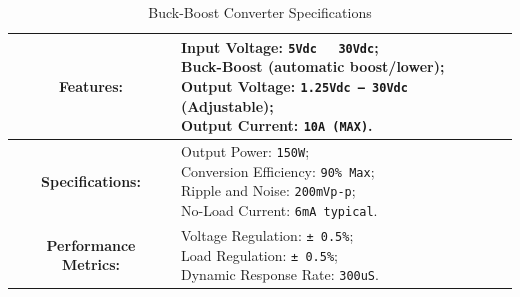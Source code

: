 \documentclass[../../main]{subfiles}
\begin{document}
\begin{table}[ht]
    \centering
    \begin{tabular}{|c|p{10cm}|} %
    \hline
    \textbf{Features:} & \parbox{11cm}{\centering \vspace{5pt}
    Input Voltage: \texttt{5Vdc ~ 30Vdc}; \\
    Buck-Boost (automatic boost/lower); \\
    Output Voltage: \texttt{1.25Vdc -- 30Vdc} (Adjustable);\\
    Output Current: \texttt{10A (MAX)}.\vspace{5pt}} \\ \hline
    \textbf{Specifications:} & \parbox{11cm}{\centering \vspace{5pt}
    Output Power: \texttt{150W}; \\
    Conversion Efficiency: \texttt{90\% Max}; \\
    Ripple and Noise: \texttt{200mVp-p}; \\
    No-Load Current: \texttt{6mA typical}.\vspace{5pt}} \\ \hline
    \textbf{Performance Metrics:} & \parbox{11cm}{\centering \vspace{5pt}
    Voltage Regulation: \texttt{± 0.5\%}; \\
    Load Regulation: \texttt{± 0.5\%}; \\
    Dynamic Response Rate: \texttt{300uS}.\vspace{5pt}} \\ \hline
    \end{tabular}
    \caption{Buck-Boost Converter Specifications}
    \label{Linear actuator booster specifications} %
    \end{table}

\end{document}

